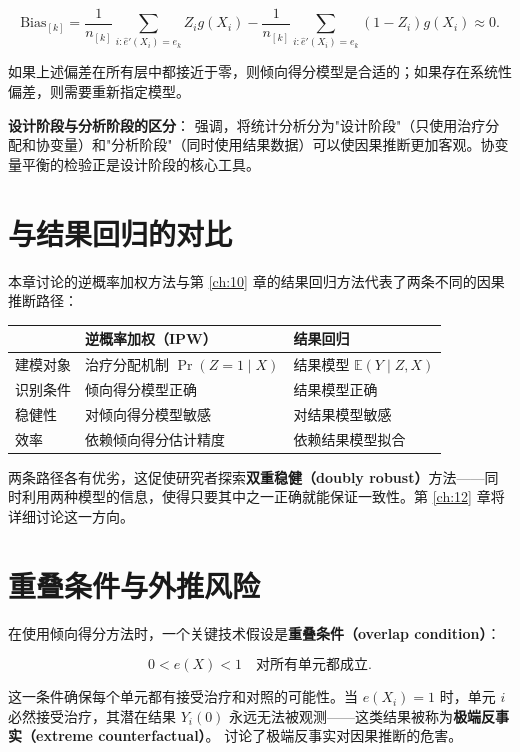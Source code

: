 \[
\text{Bias}_{[k]} = \frac{1}{n_{[k]}} \sum_{i: \hat{e}'(X_i) = e_k} Z_i g(X_i) - \frac{1}{n_{[k]}} \sum_{i: \hat{e}'(X_i) = e_k} (1-Z_i) g(X_i) \approx 0 .
\]

如果上述偏差在所有层中都接近于零，则倾向得分模型是合适的；如果存在系统性偏差，则需要重新指定模型。

\textbf{设计阶段与分析阶段的区分}：\citet{Rubin:2008} 强调，将统计分析分为"设计阶段"（只使用治疗分配和协变量）和"分析阶段"（同时使用结果数据）可以使因果推断更加客观。协变量平衡的检验正是设计阶段的核心工具。

\section{与结果回归的对比}\label{sec:11-regression-comparison}

本章讨论的逆概率加权方法与第 \ref{ch:10} 章的结果回归方法代表了两条不同的因果推断路径：

\begin{center}
\label{tab:11-ipw-vs-regression}
\begin{tabular}{lll}
\toprule
 & \textbf{逆概率加权（IPW）} & \textbf{结果回归} \\
\midrule
建模对象 & 治疗分配机制 $\Pr(Z=1 \mid X)$ & 结果模型 $\mathbb{E}(Y \mid Z, X)$ \\
识别条件 & 倾向得分模型正确 & 结果模型正确 \\
稳健性 & 对倾向得分模型敏感 & 对结果模型敏感 \\
效率 & 依赖倾向得分估计精度 & 依赖结果模型拟合 \\
\bottomrule
\end{tabular}
\end{center}

两条路径各有优劣，这促使研究者探索\textbf{双重稳健（doubly robust）}方法——同时利用两种模型的信息，使得只要其中之一正确就能保证一致性。第 \ref{ch:12} 章将详细讨论这一方向。

\section{重叠条件与外推风险}\label{sec:11-overlap}

在使用倾向得分方法时，一个关键技术假设是\textbf{重叠条件（overlap condition）}：

\[
0 < e(X) < 1 \quad \text{对所有单元都成立}.
\]

这一条件确保每个单元都有接受治疗和对照的可能性。当 $e(X_i) = 1$ 时，单元 $i$ 必然接受治疗，其潜在结果 $Y_i(0)$ 永远无法被观测——这类结果被称为\textbf{极端反事实（extreme counterfactual）}。\citet{KingZeng:2006} 讨论了极端反事实对因果推断的危害。

